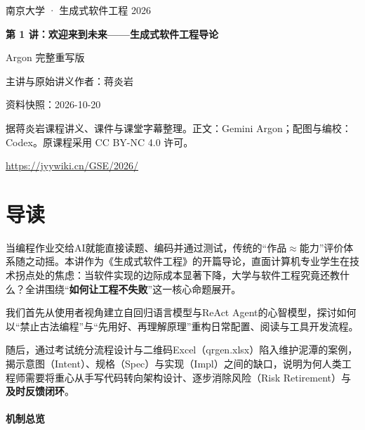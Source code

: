\documentclass[UTF8,a4paper,11pt,fontset=fandol]{ctexart}
\begin{document}
\begin{titlepage}\centering\vspace*{25mm}

{\Large 南京大学 · 生成式软件工程 2026\par}\vspace{12mm}

{\Huge\bfseries 第 1 讲：欢迎来到未来——生成式软件工程导论\par}\vspace{10mm}

{\Large Argon 完整重写版\par}\vspace{10mm}

主讲与原始讲义作者：蒋炎岩\par

资料快照：2026-10-20\par\vfill

据蒋炎岩课程讲义、课件与课堂字幕整理。正文：Gemini Argon；配图与编校：Codex。原课程采用 CC BY-NC 4.0 许可。

\vspace{8mm}\url{https://jyywiki.cn/GSE/2026/}

\end{titlepage}

\tableofcontents\clearpage

\section*{导读}

当编程作业交给AI就能直接读题、编码并通过测试，传统的“作品\ensuremath{\approx}能力”评价体系随之动摇。本讲作为《生成式软件工程》的开篇导论，直面计算机专业学生在技术拐点处的焦虑：当软件实现的边际成本显著下降，大学与软件工程究竟还教什么？全讲围绕“\textbf{如何让工程不失败}”这一核心命题展开。

我们首先从使用者视角建立自回归语言模型与ReAct Agent的心智模型，探讨如何以“禁止古法编程”与“先用好、再理解原理”重构日常配置、阅读与工具开发流程。

随后，通过考试统分流程设计与二维码Excel（qrgen.xlsx）陷入维护泥潭的案例，揭示意图（Intent）、规格（Spec）与实现（Impl）之间的缺口，说明为何人类工程师需要将重心从手写代码转向架构设计、逐步消除风险（Risk Retirement）与\textbf{及时反馈闭环}。

\paragraph{机制总览}
\end{document}
